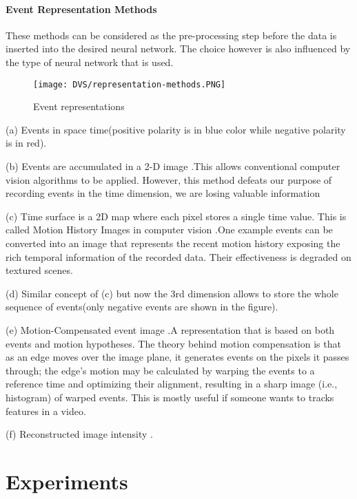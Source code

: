 \documentclass[12pt]{report}
\begin{document}
\subsubsection{Event Representation Methods}
These methods can be considered as the pre-processing step before the data is inserted into the desired neural network. The choice however is also influenced by the type of neural network that is used.
\begin{figure}[htp] %
    \centering
     \texttt{[image: DVS/representation-methods.PNG]}
    \caption{Event representations}
    \label{fig:representation-methods}
\end{figure}


(a) Events in space time(positive polarity is in blue color while negative polarity is in red).

(b) Events are accumulated in a 2-D image .This allows conventional computer vision algorithms to be applied. However, this method defeats our purpose of recording events in the time dimension, we are losing valuable information

(c) Time surface is a 2D map where each pixel stores a single time value. This is called Motion History Images in computer vision \cite{ahad2012} .One example \cite{lagorge2017} events can be converted into an image that represents the recent motion history exposing the rich temporal information of the recorded data. Their effectiveness is degraded on textured scenes.

(d) Similar concept of (c) but now the 3rd dimension allows to store the whole sequence of events(only negative events are shown in the figure).

(e) Motion-Compensated event image \cite{Gallego2019} .A representation that is based on both events and motion hypotheses. The theory behind motion compensation is that as an edge moves over the image plane, it generates events on the pixels it passes through; the edge's motion may be calculated by warping the events to a reference time and optimizing their alignment, resulting in a sharp image (i.e., histogram) of warped events. This is mostly useful if someone wants to tracks features in a video.

(f) Reconstructed image intensity \cite{rebecq2019}.


\chapter{Experiments}


\end{document}
